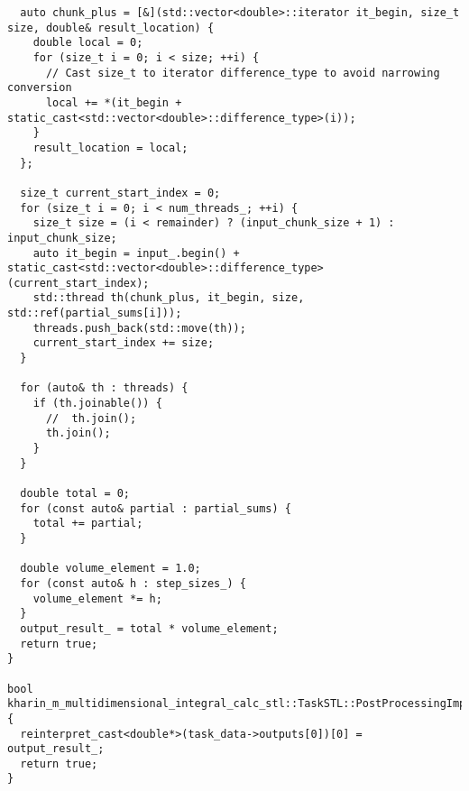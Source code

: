 \documentclass[12pt]{article}
\begin{document}
\begin{lstlisting}
  auto chunk_plus = [&](std::vector<double>::iterator it_begin, size_t size, double& result_location) {
    double local = 0;
    for (size_t i = 0; i < size; ++i) {
      // Cast size_t to iterator difference_type to avoid narrowing conversion
      local += *(it_begin + static_cast<std::vector<double>::difference_type>(i));
    }
    result_location = local;
  };

  size_t current_start_index = 0;
  for (size_t i = 0; i < num_threads_; ++i) {
    size_t size = (i < remainder) ? (input_chunk_size + 1) : input_chunk_size;
    auto it_begin = input_.begin() + static_cast<std::vector<double>::difference_type>(current_start_index);
    std::thread th(chunk_plus, it_begin, size, std::ref(partial_sums[i]));
    threads.push_back(std::move(th));
    current_start_index += size;
  }

  for (auto& th : threads) {
    if (th.joinable()) {
      //  th.join();
      th.join();
    }
  }

  double total = 0;
  for (const auto& partial : partial_sums) {
    total += partial;
  }

  double volume_element = 1.0;
  for (const auto& h : step_sizes_) {
    volume_element *= h;
  }
  output_result_ = total * volume_element;
  return true;
}

bool kharin_m_multidimensional_integral_calc_stl::TaskSTL::PostProcessingImpl() {
  reinterpret_cast<double*>(task_data->outputs[0])[0] = output_result_;
  return true;
}
\end{lstlisting}
\end{document}

